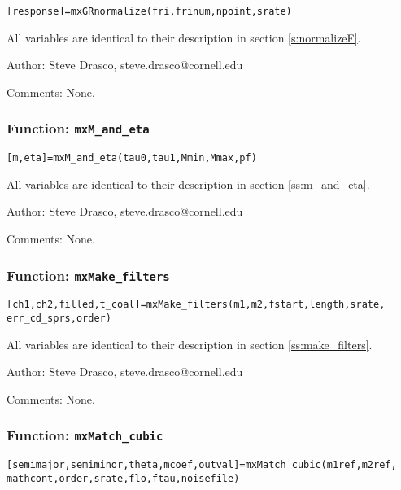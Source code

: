 \texttt{[response]=mxGRnormalize(fri,frinum,npoint,srate)}

All variables are identical to their description in section \ref{s:normalizeF}.

\begin{description}
\item{Author:} Steve Drasco, steve.drasco@cornell.edu
\item{Comments:} None.
\end{description}

\subsubsection{Function: {\tt mxM\_and\_eta}}
\label{sss:mxM_and_eta}

\texttt{[m,eta]=mxM\_and\_eta(tau0,tau1,Mmin,Mmax,pf)}

All variables are identical to their description in section \ref{ss:m_and_eta}.

\begin{description}
\item{Author:} Steve Drasco, steve.drasco@cornell.edu
\item{Comments:} None.
\end{description}

\subsubsection{Function: {\tt mxMake\_filters}}
\label{sss:mxMake_filters}

\texttt{[ch1,ch2,filled,t\_coal]=mxMake\_filters(m1,m2,fstart,length,srate,} \\
\texttt{err\_cd\_sprs,order)}

All variables are identical to their description in section \ref{ss:make_filters}.

\begin{description}
\item{Author:} Steve Drasco, steve.drasco@cornell.edu
\item{Comments:} None.
\end{description}

\subsubsection{Function: {\tt mxMatch\_cubic}}
\label{sss:mxMatch_cubic}

\texttt{[semimajor,semiminor,theta,mcoef,outval]=mxMatch\_cubic(m1ref,m2ref,} \\
\texttt{mathcont,order,srate,flo,ftau,noisefile)}

